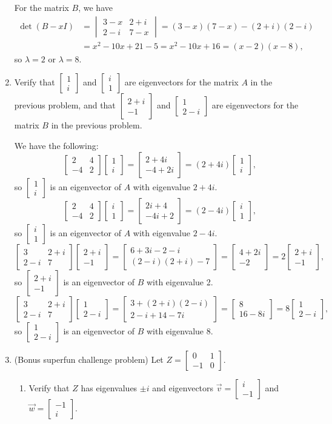 \documentclass[12pt]{article}
\renewcommand{\i}{\mathbf{i}}
\newcommand{\bbm}{\begin{bmatrix}}
\newcommand{\ebm}{\end{bmatrix}}
\newcommand{\bvm}{\begin{vmatrix}}
\newcommand{\evm}{\end{vmatrix}}
\begin{document}
\begin{enumerate}
For the matrix $B$, we have
\begin{align*}
 \det(B-xI) &= \bvm 3-x&2+i\\2-i&7-x\evm = (3-x)(7-x)-(2+i)(2-i)\\
& = x^2-10x+21-5 = x^2-10x+16 = (x-2)(x-8),
\end{align*}
so $\lambda=2$ or $\lambda=8$.

\item Verify that $\bbm 1\\i\ebm$ and $\bbm i\\1\ebm$ are eigenvectors for the matrix $A$ in the previous problem, and that $\bbm 2+i\\-1\ebm$ and $\bbm 1\\2-i\ebm$ are eigenvectors for the matrix $B$ in the previous problem.

We have the following:
\[
 \bbm 2&4\\-4&2\ebm\bbm 1\\i\ebm = \bbm 2+4i\\-4+2i\ebm = (2+4i)\bbm 1\\i\ebm,
\]
so $\bbm 1\\i\ebm$ is an eigenvector of $A$ with eigenvalue $2+4i$.
\[
 \bbm 2&4\\-4&2\ebm\bbm i\\1\ebm = \bbm 2i+4\\-4i+2\ebm = (2-4i)\bbm i\\1\ebm,
\]
so $\bbm i\\1\ebm$ is an eigenvector of $A$ with eigenvalue  $2-4i$.
\[
 \bbm 3&2+i\\2-i&7\ebm\bbm 2+i\\-1\ebm = \bbm 6+3i-2-i\\(2-i)(2+i)-7\ebm = \bbm 4+2i\\-2\ebm = 2\bbm 2+i\\-1\ebm,
\]
so $\bbm 2+i\\-1\ebm$ is an eigenvector of $B$ with eigenvalue 2.
\[
 \bbm 3&2+i\\2-i&7\ebm\bbm 1\\2-i\ebm = \bbm 3+(2+i)(2-i)\\2-i+14-7i\ebm = \bbm 8\\16-8i\ebm = 8\bbm 1\\2-i\ebm,
\]
so $\bbm 1\\2-i\ebm$ is an eigenvector of $B$ with eigenvalue  8.


\item (Bonus superfun challenge problem) Let $Z=\bbm 0&1\\-1&0\ebm$.
\begin{enumerate}
\item Verify that $Z$ has eigenvalues $\pm i$ and eigenvectors $\vec{v}=\bbm i\\-1\ebm$ and $\vec{w}=\bbm -1\\i\ebm$.


\end{enumerate}
\end{enumerate}
\end{document}
